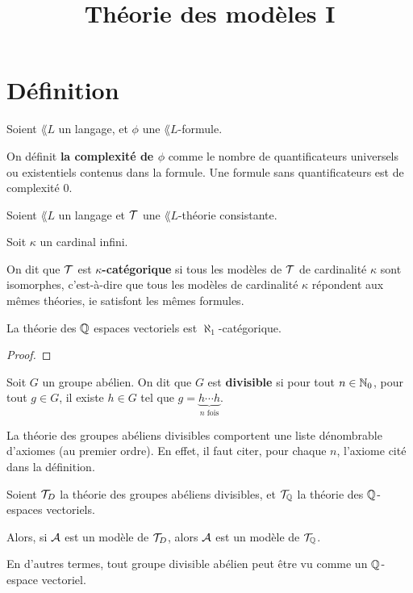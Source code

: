 \documentclass[a4paper, 12pt]{article}
\title{Théorie des modèles I}
\author{}
\begin{document}
\maketitle

\section{Définition}

\begin{definition} 
	Soient $\lang{L}$ un langage, et $\phi$ une $\lang{L}$-formule.

	On définit \textbf{la complexité de $\phi$} comme le nombre de
	quantificateurs universels ou existentiels contenus dans la formule.  Une
	formule sans quantificateurs est de complexité $0$.
\end{definition}

\begin{definition} 
	Soient $\lang{L}$ un langage et $\mathcal{T}$ une $\lang{L}$-théorie consistante.

	Soit $\kappa$ un cardinal infini.

	On dit que $\mathcal{T}$ est \textbf{$\kappa$-catégorique} si tous les
	modèles de $\mathcal{T}$ de cardinalité $\kappa$ sont isomorphes,
	c'est-à-dire que tous les modèles de cardinalité $\kappa$ répondent aux
	mêmes théories, ie satisfont les mêmes formules.
\end{definition}

\begin{proposition}
	La théorie des $\mathbb{Q}$ espaces vectoriels est $\aleph_{1}$-catégorique.
\end{proposition}

\begin{proof}

\end{proof}

\begin{definition} 
	Soit $G$ un groupe abélien. On dit que $G$ est \textbf{divisible} si pour
	tout $n \in \mathbb{N}_{0}$, pour tout $g \in G$, il existe $h \in G$ tel que
	$g = \underbrace{h \cdots h}_{n \text{ fois}}$.
\end{definition}

La théorie des groupes abéliens divisibles comportent une liste dénombrable
d'axiomes (au premier ordre). En effet, il faut citer, pour chaque $n$, l'axiome
cité dans la définition.

\begin{proposition}
	Soient $\mathcal{T}_{D}$ la théorie des groupes abéliens divisibles, et
	$\mathcal{T}_{\mathbb{Q}}$ la théorie des $\mathbb{Q}$-espaces vectoriels.

	Alors, si $\mathcal{A}$ est un modèle de $\mathcal{T}_{D}$, alors $\mathcal{A}$ est
	un modèle de $\mathcal{T}_{\mathbb{Q}}$.

	En d'autres termes, tout groupe divisible abélien peut être vu comme un
	$\mathbb{Q}$-espace vectoriel.
\end{proposition}
\end{document}

